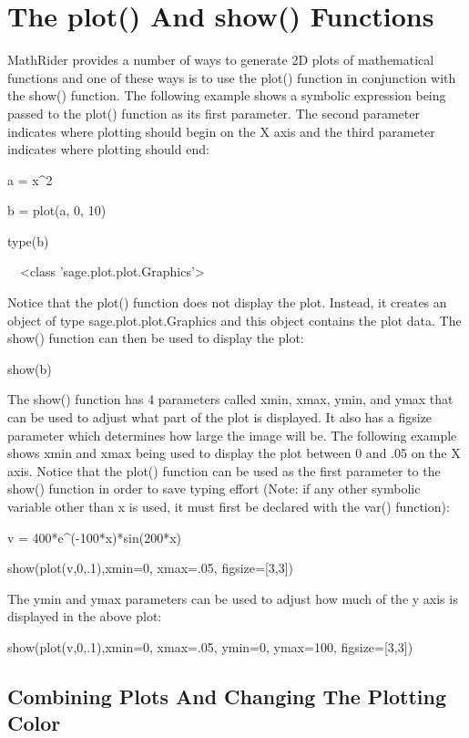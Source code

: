 \documentclass[12pt,oneside]{book}
\begin{document}
\section[The plot() And show() Functions]{The plot() And show() Functions}

MathRider provides a number of ways to generate 2D plots of mathematical functions and one of these ways is to use the plot() function in conjunction with the show() function. The following example shows a symbolic expression being passed to the plot() function as its first parameter. The second parameter indicates where plotting should begin on the X axis and the third parameter indicates where plotting should end:

a = x\^{}2

b = plot(a, 0, 10)

type(b)

{\textbar}

\ \ {\textless}class 'sage.plot.plot.Graphics'{\textgreater}


Notice that the plot() function does not display the plot. Instead, it creates an object of type sage.plot.plot.Graphics and this object contains the plot data. The show() function can then be used to display the plot: 

show(b)

{\textbar}


The show() function has 4 parameters called xmin, xmax, ymin, and ymax that can be used to adjust what part of the plot is displayed. It also has a figsize parameter which determines how large the image will be. The following example shows xmin and xmax being used to display the plot between 0 and .05 on the X axis. Notice that the plot() function can be used as the first parameter to the show() function in order to save typing effort (Note: if any other symbolic variable other than x is used, it must first be declared with the var() function): 

v = 400*e\^{}({}-100*x)*sin(200*x)

show(plot(v,0,.1),xmin=0, xmax=.05, figsize=[3,3])

{\textbar}


The ymin and ymax parameters can be used to adjust how much of the y axis is displayed in the above plot: 

show(plot(v,0,.1),xmin=0, xmax=.05, ymin=0, ymax=100, figsize=[3,3])

{\textbar}


\subsection[Combining Plots And Changing The Plotting Color]{Combining Plots And Changing The Plotting Color}
\end{document}
